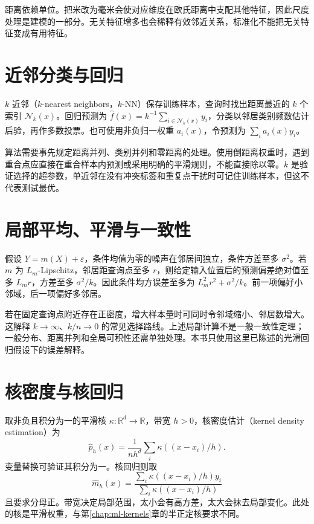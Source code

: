 \documentclass[UTF8,12pt,a4paper,fontset=fandol]{ctexbook}
\begin{document}
距离依赖单位。把米改为毫米会使对应维度在欧氏距离中支配其他特征，因此尺度处理是建模的一部分。无关特征增多也会稀释有效邻近关系，标准化不能把无关特征变成有用特征。

\section{近邻分类与回归}

$k$ 近邻（$k$-nearest neighbors，$k$-NN）保存训练样本，查询时找出距离最近的 $k$ 个索引 $\mathcal N_k(x)$。回归预测为 $\widehat f(x)=k^{-1}\sum_{i\in\mathcal N_k(x)}y_i$，分类以邻居类别频数估计后验，再作多数投票。也可使用非负归一权重 $a_i(x)$，令预测为 $\sum_i a_i(x)y_i$。

算法需要事先规定距离并列、类别并列和零距离的处理。使用倒距离权重时，遇到重合点应直接在重合样本内预测或采用明确的平滑规则，不能直接除以零。$k$ 是验证选择的超参数，单近邻在没有冲突标签和重复点干扰时可记住训练样本，但这不代表测试最优。

\section{局部平均、平滑与一致性}

假设 $Y=m(X)+\varepsilon$，条件均值为零的噪声在邻居间独立，条件方差至多 $\sigma^2$。若 $m$ 为 $L_m$-Lipschitz，邻居距查询点至多 $r$，则给定输入位置后的预测偏差绝对值至多 $L_mr$，方差至多 $\sigma^2/k$。因此条件均方误差至多为 $L_m^2r^2+\sigma^2/k$。前一项偏好小邻域，后一项偏好多邻居。

若在固定查询点附近存在正密度，增大样本量时可同时令邻域缩小、邻居数增大。这解释 $k\to\infty$、$k/n\to0$ 的常见选择路线。上述局部计算不是一般一致性定理；一般分布、距离并列和全局可积性还需单独处理。本书只使用这里已陈述的光滑回归假设下的误差解释。

\section{核密度与核回归}

取非负且积分为一的平滑核 $\kappa:\mathbb R^d\to\mathbb R$，带宽 $h>0$，核密度估计（kernel density estimation）为
\begin{equation}
 \widehat p_h(x)=\frac1{nh^d}\sum_i\kappa((x-x_i)/h).
 \label{eq:ml-kde}
\end{equation}
变量替换可验证其积分为一。核回归则取
\[
 \widehat m_h(x)=
 \frac{\sum_i\kappa((x-x_i)/h)y_i}{\sum_i\kappa((x-x_i)/h)}
\]
且要求分母正。带宽决定局部范围，太小会有高方差，太大会抹去局部变化。此处的核是平滑权重，与第\ref{chap:ml-kernels}章的半正定核要求不同。
\end{document}
